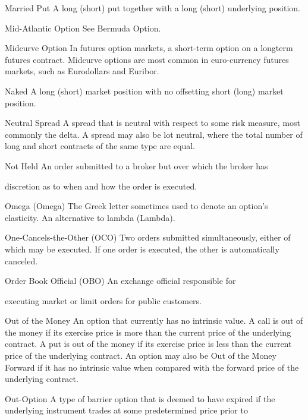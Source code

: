 Married Put A long (short) put together with a long (short) underlying position.\par
Mid-Atlantic Option See Bermuda Option.\par
Midcurve Option In futures option markets, a short-term option on a longterm futures contract. Midcurve options are most common in euro-currency futures markets, such as Eurodollars and Euribor.\par
Naked A long (short) market position with no offsetting short (long) market position.\par
Neutral Spread A spread that is neutral with respect to some risk measure, most commonly the delta. A spread may also be lot neutral, where the total number of long and short contracts of the same type are equal.\par
Not Held An order submitted to a broker but over which the broker has\par
discretion as to when and how the order is executed.\par
Omega (Omega) The Greek letter sometimes used to denote an option's elasticity. An alternative to lambda (Lambda).\par
One-Cancels-the-Other (OCO) Two orders submitted simultaneously, either of which may be executed. If one order is executed, the other is automatically canceled.\par
Order Book  Official (OBO) An  exchange  official  responsible  for\par
executing market or limit orders for public customers.\par
Out of the Money An option that currently has no intrinsic value. A call is out of the money if its exercise price is more than the current price of the underlying contract. A put is out of the money if its exercise price is less than the current price of the underlying contract. An option may also be Out of the Money Forward if it has no intrinsic value when compared with the forward price of the underlying contract.\par
Out-Option A type of barrier option that is deemed to have expired if the underlying instrument trades at some predetermined price prior to\par

